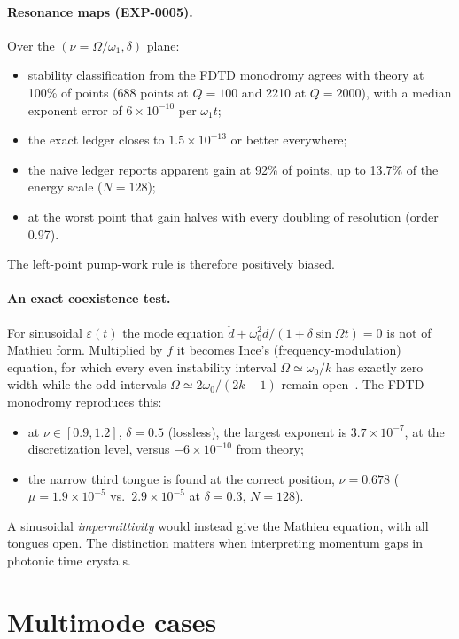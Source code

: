 \documentclass[aps,pre,reprint,superscriptaddress,amsmath,amssymb]{revtex4-2}
\begin{document}
\paragraph{Resonance maps (EXP-0005).} Over the $(\nu=\Omega/\omega_1,\delta)$ plane:
\begin{itemize}
\item stability classification from the FDTD monodromy agrees with theory at
  100\% of points (688 points at $Q=100$ and 2210 at $Q=2000$), with a median
  exponent error of $6\times10^{-10}$ per $\omega_1t$;
\item the exact ledger closes to $1.5\times10^{-13}$ or better everywhere;
\item the naive ledger reports apparent gain at 92\% of points, up to 13.7\% of the
  energy scale ($N=128$);
\item at the worst point that gain halves with every doubling of resolution
  (order 0.97).
\end{itemize}
The left-point pump-work rule is therefore positively biased.

\paragraph{An exact coexistence test.} For sinusoidal $\varepsilon(t)$ the mode
equation $\ddot d+\omega_0^2d/(1+\delta\sin\Omega t)=0$ is not of Mathieu form.
Multiplied by $f$ it becomes Ince's (frequency-modulation) equation, for which every
even instability interval $\Omega\simeq\omega_0/k$ has exactly zero width while the
odd intervals $\Omega\simeq2\omega_0/(2k-1)$ remain open~\cite{Cambi1948,Figotin2026}.
The FDTD monodromy reproduces this:
\begin{itemize}
\item at $\nu\in[0.9,1.2]$, $\delta=0.5$ (lossless), the largest exponent is
  $3.7\times10^{-7}$, at the discretization level, versus $-6\times10^{-10}$ from
  theory;
\item the narrow third tongue is found at the correct position, $\nu=0.678$
  ($\mu=1.9\times10^{-5}$ vs.\ $2.9\times10^{-5}$ at $\delta=0.3$, $N=128$).
\end{itemize}
A sinusoidal \emph{impermittivity} would instead give the Mathieu equation, with all
tongues open. The distinction matters when interpreting momentum gaps in photonic
time crystals.

\section{Multimode cases}
\end{document}
